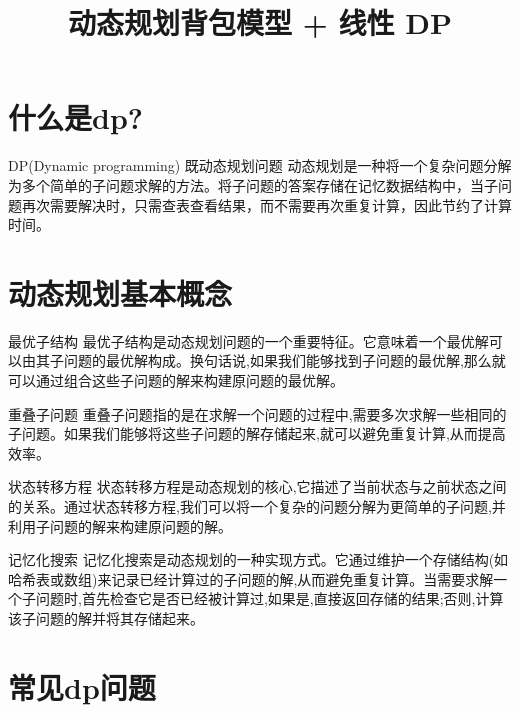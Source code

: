\documentclass{beamer}
\title{动态规划背包模型 + 线性 DP}
\author{}
\date{}
\begin{document}
\frame{\titlepage}

\section{什么是dp?}

\begin{frame}{DP(Dynamic programming) 既动态规划问题}
    动态规划是一种将一个复杂问题分解为多个简单的子问题求解的方法。将子问题的答案存储在记忆数据结构中，当子问题再次需要解决时，只需查表查看结果，而不需要再次重复计算，因此节约了计算时间。
\end{frame}

\section{动态规划基本概念}

\begin{frame}{最优子结构}
    最优子结构是动态规划问题的一个重要特征。它意味着一个最优解可以由其子问题的最优解构成。换句话说,如果我们能够找到子问题的最优解,那么就可以通过组合这些子问题的解来构建原问题的最优解。
\end{frame}

\begin{frame}{重叠子问题}
    重叠子问题指的是在求解一个问题的过程中,需要多次求解一些相同的子问题。如果我们能够将这些子问题的解存储起来,就可以避免重复计算,从而提高效率。
\end{frame}

\begin{frame}{状态转移方程}
    状态转移方程是动态规划的核心,它描述了当前状态与之前状态之间的关系。通过状态转移方程,我们可以将一个复杂的问题分解为更简单的子问题,并利用子问题的解来构建原问题的解。
\end{frame}

\begin{frame}{记忆化搜索}
    记忆化搜索是动态规划的一种实现方式。它通过维护一个存储结构(如哈希表或数组)来记录已经计算过的子问题的解,从而避免重复计算。当需要求解一个子问题时,首先检查它是否已经被计算过,如果是,直接返回存储的结果;否则,计算该子问题的解并将其存储起来。
\end{frame}

\section{常见dp问题}
\end{document}
